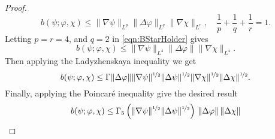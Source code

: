 \begin{proof}
\begin{equation}
    b(\psi; \varphi, \chi) \le \|\nabla \psi\|_{L^p} \|\Delta \varphi\|_{L^q}
    \|\nabla \chi\|_{L^r},\quad \frac{1}{p} + \frac{1}{q} + \frac{1}{r} = 1.
    \label{eqn:BStarHolder}
  \end{equation}
  Letting $p = r = 4$, and $q = 2$ in \eqref{eqn:BStarHolder} gives
  \begin{equation*}
    b(\psi; \varphi, \chi) \le \|\nabla \psi\|_{L^4} \|\Delta \varphi\|
    \|\nabla \chi\|_{L^4}.
  \end{equation*}
  Then applying the Ladyzhenskaya inequality we get
  \begin{equation*}
    b(\psi;\varphi,\chi) \le \Gamma \|\Delta \varphi\|
      \|\nabla \psi\|^{\nicefrac{1}{2}} \|\Delta \psi\|^{\nicefrac{1}{2}}
      \|\nabla \chi\|^{\nicefrac{1}{2}} \|\Delta \chi\|^{\nicefrac{1}{2}}.
  \end{equation*}
  Finally, applying the Poincar\'e inequality give the desired result
  \begin{equation*}
    b(\psi;\varphi,\chi) \le \Gamma_5 \left(\|\nabla \psi\|^{\nicefrac{1}{2}}
      \|\Delta \psi\|^{\nicefrac{1}{2}}\right)\,
      \|\Delta \varphi\|\, \|\Delta \chi\|
  \end{equation*}
\end{proof}

